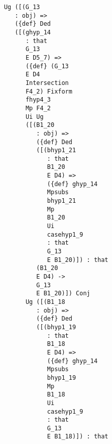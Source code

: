 \documentclass[12pt]{article}
\begin{document}
\begin{verbatim}
                               Ug ([(G_13 
                                  : obj) => 
                                  ({def} Ded 
                                  ([(ghyp_14 
                                     : that 
                                     G_13 
                                     E D5_7) => 
                                     ({def} (G_13 
                                     E D4 
                                     Intersection 
                                     F4_2) Fixform 
                                     fhyp4_3 
                                     Mp F4_2 
                                     Ui Ug 
                                     ([(B1_20 
                                        : obj) => 
                                        ({def} Ded 
                                        ([(bhyp1_21 
                                           : that 
                                           B1_20 
                                           E D4) => 
                                           ({def} ghyp_14 
                                           Mpsubs 
                                           bhyp1_21 
                                           Mp 
                                           B1_20 
                                           Ui 
                                           casehyp1_9 
                                           : that 
                                           G_13 
                                           E B1_20)]) : that 
                                        (B1_20 
                                        E D4) -> 
                                        G_13 
                                        E B1_20)]) Conj 
                                     Ug ([(B1_18 
                                        : obj) => 
                                        ({def} Ded 
                                        ([(bhyp1_19 
                                           : that 
                                           B1_18 
                                           E D4) => 
                                           ({def} ghyp_14 
                                           Mpsubs 
                                           bhyp1_19 
                                           Mp 
                                           B1_18 
                                           Ui 
                                           casehyp1_9 
                                           : that 
                                           G_13 
                                           E B1_18)]) : that 

\end{verbatim}
\end{document}
